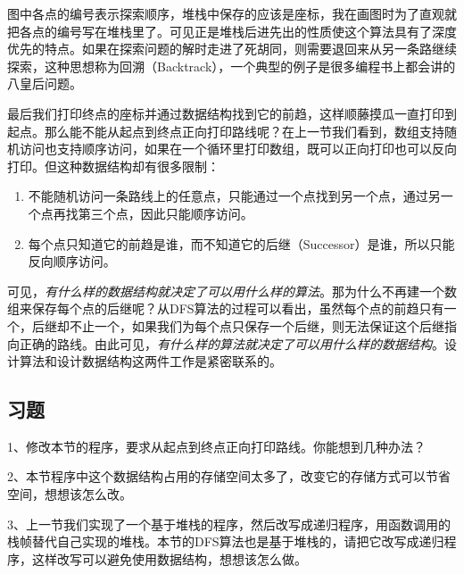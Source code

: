 图中各点的编号表示探索顺序，堆栈中保存的应该是座标，我在画图时为了直观就把各点的编号写在堆栈里了。可见正是堆栈后进先出的性质使这个算法具有了深度优先的特点。如果在探索问题的解时走进了死胡同，则需要退回来从另一条路继续探索，这种思想称为回溯（Backtrack），一个典型的例子是很多编程书上都会讲的八皇后问题。



最后我们打印终点的座标并通过数据结构找到它的前趋，这样顺藤摸瓜一直打印到起点。那么能不能从起点到终点正向打印路线呢？在上一节我们看到，数组支持随机访问也支持顺序访问，如果在一个循环里打印数组，既可以正向打印也可以反向打印。但这种数据结构却有很多限制：


\begin{enumerate}

\item 不能随机访问一条路线上的任意点，只能通过一个点找到另一个点，通过另一个点再找第三个点，因此只能顺序访问。

\item 每个点只知道它的前趋是谁，而不知道它的后继（Successor）是谁，所以只能反向顺序访问。
\end{enumerate}


可见，\emph{有什么样的数据结构就决定了可以用什么样的算法}。那为什么不再建一个数组来保存每个点的后继呢？从DFS算法的过程可以看出，虽然每个点的前趋只有一个，后继却不止一个，如果我们为每个点只保存一个后继，则无法保证这个后继指向正确的路线。由此可见，\emph{有什么样的算法就决定了可以用什么样的数据结构}。设计算法和设计数据结构这两件工作是紧密联系的。


\subsection*{习题}
%


1、修改本节的程序，要求从起点到终点正向打印路线。你能想到几种办法？



2、本节程序中这个数据结构占用的存储空间太多了，改变它的存储方式可以节省空间，想想该怎么改。



3、上一节我们实现了一个基于堆栈的程序，然后改写成递归程序，用函数调用的栈帧替代自己实现的堆栈。本节的DFS算法也是基于堆栈的，请把它改写成递归程序，这样改写可以避免使用数据结构，想想该怎么做。




